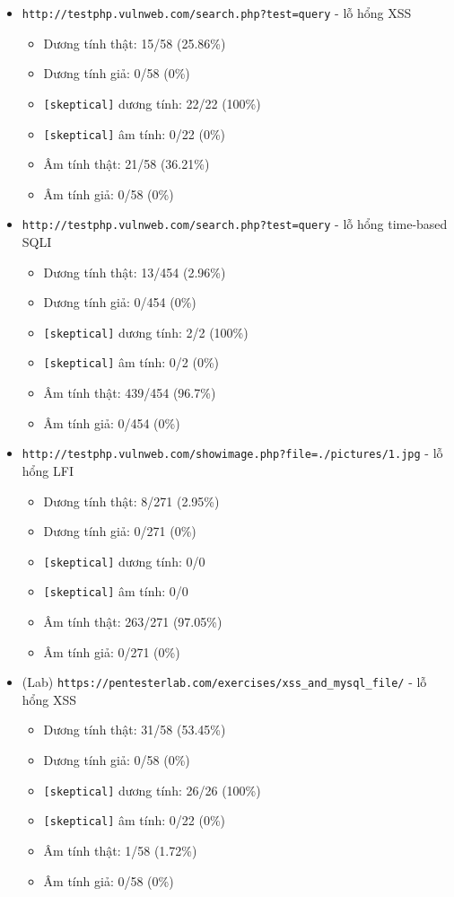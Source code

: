 \begin{itemize}
    \item \texttt{http://testphp.vulnweb.com/search.php?test=query} - lỗ hổng XSS
    \begin{itemize}
        \item Dương tính thật: 15/58 (25.86\%)
        \item Dương tính giả: 0/58 (0\%)
        \item \texttt{[skeptical]} dương tính: 22/22 (100\%)
        \item \texttt{[skeptical]} âm tính: 0/22 (0\%)
        \item Âm tính thật: 21/58 (36.21\%)
        \item Âm tính giả: 0/58 (0\%)
    \end{itemize}
    \item \texttt{http://testphp.vulnweb.com/search.php?test=query} - lỗ hổng time-based SQLI
    \begin{itemize}
        \item Dương tính thật: 13/454 (2.96\%)
        \item Dương tính giả: 0/454 (0\%)
        \item \texttt{[skeptical]} dương tính: 2/2 (100\%)
        \item \texttt{[skeptical]} âm tính: 0/2 (0\%)
        \item Âm tính thật: 439/454 (96.7\%)
        \item Âm tính giả: 0/454 (0\%)
    \end{itemize}
    \item \texttt{http://testphp.vulnweb.com/showimage.php?file=./pictures/1.jpg} - lỗ hổng LFI
    \begin{itemize}
        \item Dương tính thật: 8/271 (2.95\%)
        \item Dương tính giả: 0/271 (0\%)
        \item \texttt{[skeptical]} dương tính: 0/0
        \item \texttt{[skeptical]} âm tính: 0/0
        \item Âm tính thật: 263/271 (97.05\%)
        \item Âm tính giả: 0/271 (0\%)
    \end{itemize}
    \item (Lab) \texttt{https://pentesterlab.com/exercises/xss\_and\_mysql\_file/} - lỗ hổng XSS
    \begin{itemize}
        \item Dương tính thật: 31/58 (53.45\%)
        \item Dương tính giả: 0/58 (0\%)
        \item \texttt{[skeptical]} dương tính: 26/26 (100\%)
        \item \texttt{[skeptical]} âm tính: 0/22 (0\%)
        \item Âm tính thật: 1/58 (1.72\%)
        \item Âm tính giả: 0/58 (0\%)
    \end{itemize}
\end{itemize}
